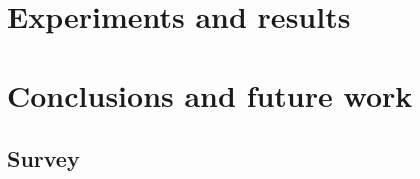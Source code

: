 \documentclass[12pt,a4paper,twoside]{tesi_upf}
\begin{document}
\chapter{Experiments and results}
\label{ch:experiments}


\chapter{Conclusions and future work}


\begin{appendices}

    \chapter{Survey}
    \label{app:survey}
    

\end{appendices}



%


\end{document}
